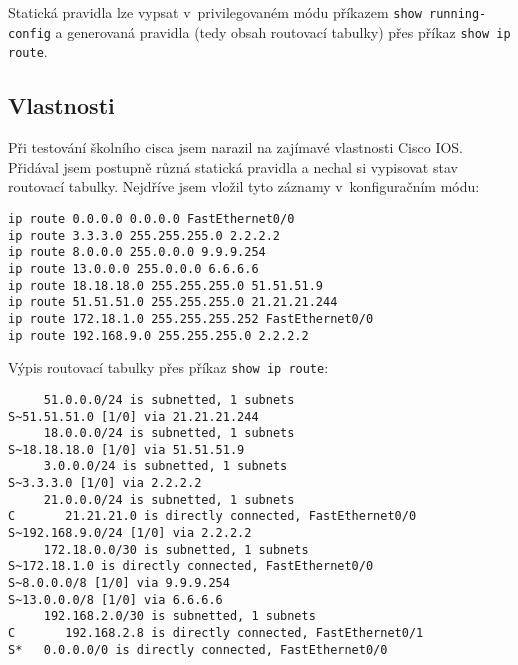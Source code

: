 Statická pravidla lze vypsat v~privilegovaném módu příkazem \verb|show running-config| a generovaná pravidla (tedy obsah routovací tabulky) přes příkaz \verb|show ip route|.

\subsection{Vlastnosti}
Při testování školního cisca jsem narazil na zajímavé vlastnosti Cisco IOS. Přidával jsem postupně různá statická pravidla a nechal si vypisovat stav routovací tabulky.
Nejdříve jsem vložil tyto záznamy v~konfiguračním módu:
\begin{verbatim}
ip route 0.0.0.0 0.0.0.0 FastEthernet0/0
ip route 3.3.3.0 255.255.255.0 2.2.2.2
ip route 8.0.0.0 255.0.0.0 9.9.9.254
ip route 13.0.0.0 255.0.0.0 6.6.6.6
ip route 18.18.18.0 255.255.255.0 51.51.51.9
ip route 51.51.51.0 255.255.255.0 21.21.21.244
ip route 172.18.1.0 255.255.255.252 FastEthernet0/0
ip route 192.168.9.0 255.255.255.0 2.2.2.2
\end{verbatim}

Výpis routovací tabulky přes příkaz \verb|show ip route|:
\begin{verbatim}
     51.0.0.0/24 is subnetted, 1 subnets
S~51.51.51.0 [1/0] via 21.21.21.244
     18.0.0.0/24 is subnetted, 1 subnets
S~18.18.18.0 [1/0] via 51.51.51.9
     3.0.0.0/24 is subnetted, 1 subnets
S~3.3.3.0 [1/0] via 2.2.2.2
     21.0.0.0/24 is subnetted, 1 subnets
C       21.21.21.0 is directly connected, FastEthernet0/0
S~192.168.9.0/24 [1/0] via 2.2.2.2
     172.18.0.0/30 is subnetted, 1 subnets
S~172.18.1.0 is directly connected, FastEthernet0/0
S~8.0.0.0/8 [1/0] via 9.9.9.254
S~13.0.0.0/8 [1/0] via 6.6.6.6
     192.168.2.0/30 is subnetted, 1 subnets
C       192.168.2.8 is directly connected, FastEthernet0/1
S*   0.0.0.0/0 is directly connected, FastEthernet0/0
\end{verbatim} 

